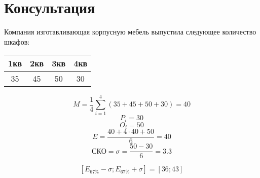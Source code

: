 
\section{Консультация}
Компания изготавливающая корпусную мебель выпустила следующее количество шкафов:
\begin{center}
\begin{tabular}{|c|c|c|c|}
  \hline
   1кв & 2кв & 3кв & 4кв \\
   \hline
   35 & 45 & 50 & 30 \\
  \hline
\end{tabular}
\end{center}

\[
  M = \frac{1}{4}\sum_{i=1}^{4} (35+45+50+30) = 40
\] 
\[
  P_i = 30
\] 
\[
  O_i = 50
\] 
\[
  E = \frac{40 + 4\cdot 40 + 50}{6} = 40
\] 
\[
  СКО = \sigma = \frac{50 - 30}{6} = 3.3
\] 

\[
  [E_{67\%}-\sigma; E_{67\%}+\sigma] = [36; 43]
\] 

